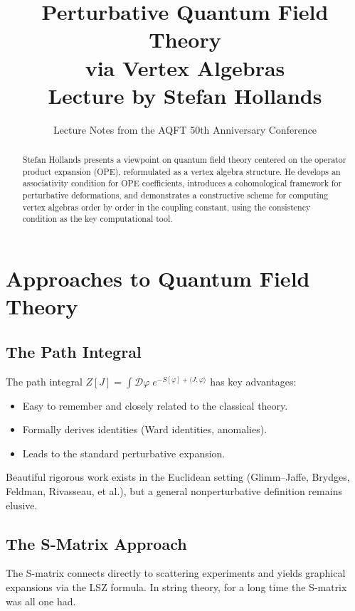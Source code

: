 \documentclass[11pt,a4paper]{article}
\title{\textbf{Perturbative Quantum Field Theory\\via Vertex Algebras}\\[6pt]
\large Lecture by Stefan Hollands}
\author{Lecture Notes from the AQFT 50th Anniversary Conference}
\date{}
\begin{document}
\maketitle

\begin{abstract}
Stefan Hollands presents a viewpoint on quantum field theory centered on the
operator product expansion (OPE), reformulated as a vertex algebra structure.
He develops an associativity condition for OPE coefficients, introduces a
cohomological framework for perturbative deformations, and demonstrates a
constructive scheme for computing vertex algebras order by order in the
coupling constant, using the consistency condition as the key computational tool.
\end{abstract}

\tableofcontents

\section{Approaches to Quantum Field Theory}

\subsection{The Path Integral}

The path integral $Z[J] = \int \mathcal{D}\varphi\; e^{-S[\varphi] + \langle J, \varphi\rangle}$
has key advantages:
\begin{itemize}[nosep]
  \item Easy to remember and closely related to the classical theory.
  \item Formally derives identities (Ward identities, anomalies).
  \item Leads to the standard perturbative expansion.
\end{itemize}
Beautiful rigorous work exists in the Euclidean setting (Glimm--Jaffe,
Brydges, Feldman, Rivasseau, et al.), but a general nonperturbative
definition remains elusive.

\subsection{The S-Matrix Approach}

The S-matrix connects directly to scattering experiments and yields
graphical expansions via the LSZ formula. In string theory, for a long
time the S-matrix was all one had.
\end{document}
